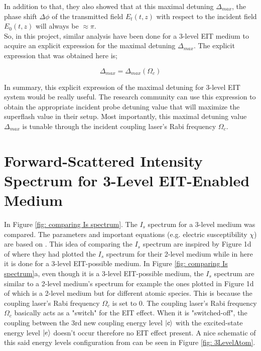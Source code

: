 In addition to that, they also showed that at this maximal detuning $\Delta_{max}$, the phase shift $\Delta\phi$ of the transmitted field $E_{t}(t, z)$ with respect to the incident field $E_{0}(t, z)$ will always be $\approx \pi$.\\

So, in this project, similar analysis have been done for a 3-level EIT medium to acquire an explicit expression for the maximal detuning $\Delta_{max}$. The explicit expression that was obtained here is;

\begin{equation}
    \Delta_{max} = \Delta_{max}(\Omega_{c})
\end{equation}

In summary, this explicit expression of the maximal detuning for 3-level EIT system would be really useful. The research community can use this expression to obtain the appropriate incident probe detuning value that will maximize the superflash value in their setup. Most importantly, this maximal detuning value $\Delta_{max}$ is tunable through the incident coupling laser's Rabi frequency $\Omega_{c}$.


\section{Forward-Scattered Intensity Spectrum for 3-Level EIT-Enabled Medium}
In Figure \ref{fig: comparing Is spectrum}. The $I_{s}$ spectrum for a 3-level medium was compared. The parameters and important equations (e.g. electric susceptibility $\chi$) are based on \cite{jeong2010slow}. This idea of comparing the $I_{s}$ spectrum are inspired by Figure 1d of \cite{Kwong2014} where they had plotted the $I_{s}$ spectrum for their 2-level medium while in here it is done for a 3-level EIT-possible medium. In Figure \ref{fig: comparing Is spectrum}a, even though it is a 3-level EIT-possible medium, the $I_{s}$ spectrum are similar to a 2-level medium's spectrum for example the ones plotted in Figure 1d of \cite{Kwong2014} which is a 2-level medium but for different atomic species. This is because the coupling laser's Rabi frequency $\Omega_{c}$ is set to $0$. The coupling laser's Rabi frequency $\Omega_{c}$ basically acts as a "switch" for the EIT effect. When it is "switched-off", the coupling between the 3rd new coupling energy level $\ket{c}$ with the excited-state energy level $\ket{e}$ doesn't occur therefore no EIT effect present. A nice schematic of this said energy levels configuration from \cite{Jeong2009} can be seen in Figure \ref{fig: 3LevelAtom}.

